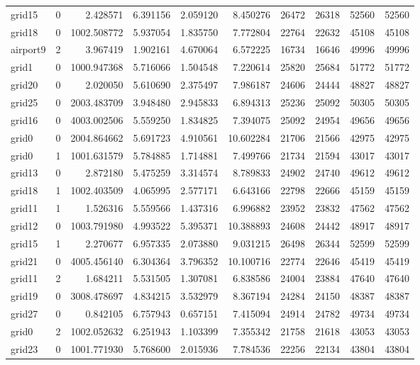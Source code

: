 \begin{longtable}{|l|r|r|r|r|r|r|r|r|r|}
grid15 & 0 & 2.428571 & 6.391156 & 2.059120 & 8.450276 & 26472 & 26318 & 52560 & 52560 \\
grid18 & 0 & 1002.508772 & 5.937054 & 1.835750 & 7.772804 & 22764 & 22632 & 45108 & 45108 \\
airport9 & 2 & 3.967419 & 1.902161 & 4.670064 & 6.572225 & 16734 & 16646 & 49996 & 49996 \\
grid1 & 0 & 1000.947368 & 5.716066 & 1.504548 & 7.220614 & 25820 & 25684 & 51772 & 51772 \\
grid20 & 0 & 2.020050 & 5.610690 & 2.375497 & 7.986187 & 24606 & 24444 & 48827 & 48827 \\
grid25 & 0 & 2003.483709 & 3.948480 & 2.945833 & 6.894313 & 25236 & 25092 & 50305 & 50305 \\
grid16 & 0 & 4003.002506 & 5.559250 & 1.834825 & 7.394075 & 25092 & 24954 & 49656 & 49656 \\
grid0 & 0 & 2004.864662 & 5.691723 & 4.910561 & 10.602284 & 21706 & 21566 & 42975 & 42975 \\
grid0 & 1 & 1001.631579 & 5.784885 & 1.714881 & 7.499766 & 21734 & 21594 & 43017 & 43017 \\
grid13 & 0 & 2.872180 & 5.475259 & 3.314574 & 8.789833 & 24902 & 24740 & 49612 & 49612 \\
grid18 & 1 & 1002.403509 & 4.065995 & 2.577171 & 6.643166 & 22798 & 22666 & 45159 & 45159 \\
grid11 & 1 & 1.526316 & 5.559566 & 1.437316 & 6.996882 & 23952 & 23832 & 47562 & 47562 \\
grid12 & 0 & 1003.791980 & 4.993522 & 5.395371 & 10.388893 & 24608 & 24442 & 48917 & 48917 \\
grid15 & 1 & 2.270677 & 6.957335 & 2.073880 & 9.031215 & 26498 & 26344 & 52599 & 52599 \\
grid21 & 0 & 4005.456140 & 6.304364 & 3.796352 & 10.100716 & 22774 & 22646 & 45419 & 45419 \\
grid11 & 2 & 1.684211 & 5.531505 & 1.307081 & 6.838586 & 24004 & 23884 & 47640 & 47640 \\
grid19 & 0 & 3008.478697 & 4.834215 & 3.532979 & 8.367194 & 24284 & 24150 & 48387 & 48387 \\
grid27 & 0 & 0.842105 & 6.757943 & 0.657151 & 7.415094 & 24914 & 24782 & 49734 & 49734 \\
grid0 & 2 & 1002.052632 & 6.251943 & 1.103399 & 7.355342 & 21758 & 21618 & 43053 & 43053 \\
grid23 & 0 & 1001.771930 & 5.768600 & 2.015936 & 7.784536 & 22256 & 22134 & 43804 & 43804 \\

\end{longtable}

